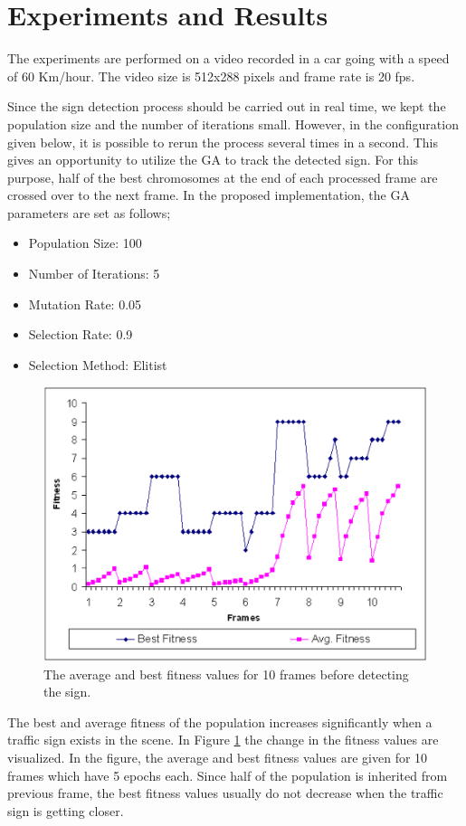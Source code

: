 \documentclass[twocolumn,letterpaper,10pt]{article}
\begin{document}
\section{Experiments and Results}
\label{sec:er}
The experiments are performed on a video recorded in a car going with a speed of 60 Km/hour. The video size is 512x288 pixels and frame rate is 20 fps. 

Since the sign detection process should be carried out in real time, we kept the population size and the number of iterations small.  However, in the configuration given below, it is possible to rerun the process several times in a second. This gives an opportunity to utilize the GA to track the detected sign. For this purpose, half of the best chromosomes at the end of each processed frame are crossed over to the next frame. In the proposed implementation, the GA parameters are set as follows;
\begin{itemize}
		\item Population Size: 100
		\item Number of Iterations: 5
		\item Mutation Rate: 0.05
		\item Selection Rate: 0.9
		\item Selection Method: Elitist
\end{itemize}
\par
\begin{figure}[ht]
\begin{center}
\includegraphics[scale=0.25]{img/gafit.eps}
\caption{The average and best fitness values for 10 frames before detecting the sign.}
\label{fig:gafit}
\end{center}
\end{figure}
\par
The best and average fitness of the population increases significantly when a traffic sign exists in the scene. In Figure \ref{fig:gafit} the change in the fitness values are visualized. In the figure, the average and best fitness values are given for 10 frames which have 5 epochs each. Since half of the population is inherited from previous frame, the best fitness values usually do not decrease when the traffic sign is getting closer.
\end{document}

